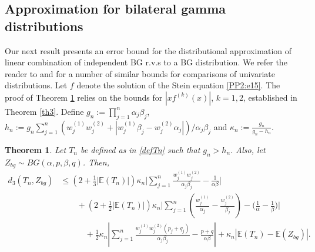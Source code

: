 \documentclass[12pt, a4paper,reqno]{amsart}
\newtheorem{thm}{Theorem}[section]
\theoremstyle{definition}
\theoremstyle{myremark}
\numberwithin{equation}{section}
\begin{document}
\subsection{Approximation for bilateral gamma distributions}Our next result presents an error bound for the distributional approximation of linear combination of independent BG r.v.s to a BG distribution. We refer the reader to \cite{dalygaunt2016} and \cite{leyreisw2017} for a number of similar bounds for comparisons of univariate distributions. 
\noindent
Let $f$ denote the solution of the Stein equation  \eqref{PP2:e15}. The proof of Theorem \ref{ApproxTHM} relies on the bounds for $|xf^{(k)}(x)|$, $k = 1, 2$, established in Theorem \ref{th3}. Define $g_n:=\prod_{j=1}^{n}\alpha_j \beta_j$,  $h_n:=g_n\sum_{j=1}^{n} (w_j^{(1)}w_j^{(2)}+|w_j^{(1)}\beta_j-w_j^{(2)}\alpha_j |  )/\alpha_j\beta_j$ and
$\kappa_n:=\frac{g_n}{g_n-h_n}.$
\vspace*{-0.4cm}
\begin{thm}\label{ApproxTHM}
Let $T_n$ be defined as in \eqref{defTn} such that $g_n> h_n$.
Also, let $Z_{bg} \sim BG(\alpha,p,\beta,q) $. Then,
\begin{align}\label{stsdbd}
\nonumber	d_{3}(T_n,Z_{bg}) & \leq \left(2+\frac{1}{3}|\mathbb{E}(T_n)|\right)\kappa_n \bigg|\sum_{j=1}^{n}\frac{w_{j}^{(1)}w_{j}^{(2)} }{\alpha_j \beta_j}- \frac{1}{\alpha \beta}\bigg|\\
\nonumber&\quad\quad+\left(2+\frac{1}{2}|\mathbb{E}(T_n)|\right)\kappa_n\bigg| \sum_{j=1}^{n}\left(\frac{w_{j}^{(1)} }{\alpha_j}-\frac{w_{j}^{(2)}}{\beta_j} \right)  -\bigg(\frac{1}{\alpha}-\frac{1}{\beta}\bigg) \bigg|\\
&\quad\quad\quad+\frac{1}{2}\kappa_n\left| \sum_{j=1}^{n}\frac{w_{j}^{(1)}w_{j}^{(2)}(p_j+q_j)}{\alpha_j \beta_j} -\frac{p+ q}{\alpha \beta} \right|+\kappa_n\left|\mathbb{E}(T_n) -\mathbb{E}(Z_{bg}) \right|. 
	\end{align}
\end{thm}
\vspace{-1.12cm}
\end{document}
